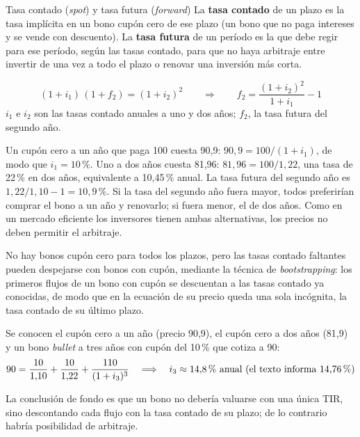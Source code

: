 \begin{definicion}{Tasa contado (\emph{spot}) y tasa futura (\emph{forward})}
La \textbf{tasa contado} de un plazo es la tasa implícita en un bono cupón cero de ese plazo (un bono que no paga intereses y se vende con descuento). La \textbf{tasa futura} de un período es la que debe regir para ese período, según las tasas contado, para que no haya arbitraje entre invertir de una vez a todo el plazo o renovar una inversión más corta.
\end{definicion}

\begin{formulaBox}
\[
(1+i_1)\,(1+f_2) = (1+i_2)^{2}
\qquad\Longrightarrow\qquad
f_2 = \frac{(1+i_2)^{2}}{1+i_1} - 1
\]
$i_1$ e $i_2$ son las tasas contado anuales a uno y dos años; $f_2$, la tasa futura del segundo año.
\end{formulaBox}

\begin{ejemplo}
Un cupón cero a un año que paga 100 cuesta 90,9: $90{,}9 = 100/(1+i_1)$, de modo que $i_1 = 10\,\%$. Uno a dos años cuesta 81,96: $81{,}96 = 100/1{,}22$, una tasa de 22\,\% en dos años, equivalente a 10,45\,\% anual. La tasa futura del segundo año es $1{,}22/1{,}10 - 1 = 10{,}9\,\%$. Si la tasa del segundo año fuera mayor, todos preferirían comprar el bono a un año y renovarlo; si fuera menor, el de dos años. Como en un mercado eficiente los inversores tienen ambas alternativas, los precios no deben permitir el arbitraje.
\end{ejemplo}

No hay bonos cupón cero para todos los plazos, pero las tasas contado faltantes pueden despejarse con bonos con cupón, mediante la técnica de \emph{bootstrapping}: los primeros flujos de un bono con cupón se descuentan a las tasas contado ya conocidas, de modo que en la ecuación de su precio queda una sola incógnita, la tasa contado de su último plazo.

\begin{ejemplo}
Se conocen el cupón cero a un año (precio 90,9), el cupón cero a dos años (81,9) y un bono \emph{bullet} a tres años con cupón del 10\,\% que cotiza a 90:
\[
90 = \frac{10}{1{,}10} + \frac{10}{1{,}22} + \frac{110}{(1+i_3)^{3}}
\quad\Longrightarrow\quad
i_3 \approx 14{,}8\,\% \ \text{anual (el texto informa 14,76\,\%)}
\]
\end{ejemplo}

La conclusión de fondo es que un bono no debería valuarse con una única TIR, sino descontando cada flujo con la tasa contado de su plazo; de lo contrario habría posibilidad de arbitraje.

